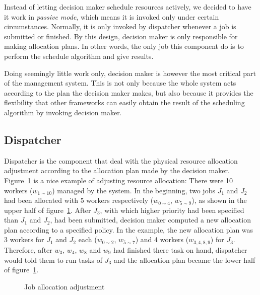 Instead of letting decision maker schedule resources actively, we
decided to have it work in \emph{passive mode}, which means it is
invoked only under certain circumstances.
Normally, it is only invoked by dispatcher whenever a job is submitted
or finished.
By this design, decision maker is only responsible for making allocation
plans.
In other words, the only job this component do is to perform the
schedule algorithm and give results.


Doing seemingly little work only, decision maker is however the most
critical part of the management system.
This is not only because the whole system acts according to the plan the
decision maker makes, but also because it provides the flexibility that
other frameworks can easily obtain the result of the scheduling
algorithm by invoking decision maker.

\subsection{Dispatcher}

Dispatcher is the component that deal with the physical resource
allocation adjustment according to the allocation plan made by the
decision maker.
Figure~\ref{fig:allocation-adjustment} is a nice example of adjusting
resource allocation: There were 10 workers ($w_{1\sim10}$) managed by
the system.
In the beginning, two jobs $J_1$ and $J_2$ had been allocated with 5
workers respectively ($w_{0\sim4}$, $w_{5\sim9}$), as shown in the upper
half of figure~\ref{fig:allocation-adjustment}.
After $J_3$, with which higher priority had been specified than $J_1$
and $J_2$, had been submitted, decision maker computed a new allocation
plan according to a specified policy.
In the example, the new allocation plan was 3 workers for $J_1$ and
$J_2$ each ($w_{0\sim2}$, $w_{5\sim7}$) and 4 workers ($w_{3,4,8,9}$)
for $J_3$.
Therefore, after $w_3$, $w_4$, $w_8$ and $ w_9$ had finished there task
on hand, dispatcher would told them to run tasks of $J_3$ and the
allocation plan became the lower half of
figure~\ref{fig:allocation-adjustment}.

\begin{figure}
  \centering
  
  \caption{Job allocation adjustment}
  \label{fig:allocation-adjustment}
\end{figure}
